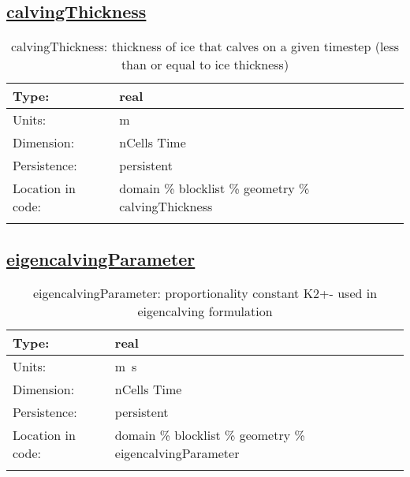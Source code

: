 \subsection[calvingThickness]{\hyperref[sec:var_tab_geometry]{calvingThickness}}
\label{subsec:var_sec_geometry_calvingThickness}
\begin{center}
\begin{longtable}{| p{2.0in} | p{4.0in} |}
        \hline 
        Type: & real \\
        \hline 
        Units: & \si{m} \\
        \hline 
        Dimension: & nCells Time \\
        \hline 
        Persistence: & persistent \\
        \hline 
         Location in code: & domain \% blocklist \% geometry \% calvingThickness \\
         \hline 
    \caption{calvingThickness: thickness of ice that calves on a given timestep (less than or equal to ice thickness)}
\end{longtable}
\end{center}
\subsection[eigencalvingParameter]{\hyperref[sec:var_tab_geometry]{eigencalvingParameter}}
\label{subsec:var_sec_geometry_eigencalvingParameter}
\begin{center}
\begin{longtable}{| p{2.0in} | p{4.0in} |}
        \hline 
        Type: & real \\
        \hline 
        Units: & \si{m.s} \\
        \hline 
        Dimension: & nCells Time \\
        \hline 
        Persistence: & persistent \\
        \hline 
         Location in code: & domain \% blocklist \% geometry \% eigencalvingParameter \\
         \hline 
    \caption{eigencalvingParameter: proportionality constant K2+- used in eigencalving formulation}
\end{longtable}
\end{center}
